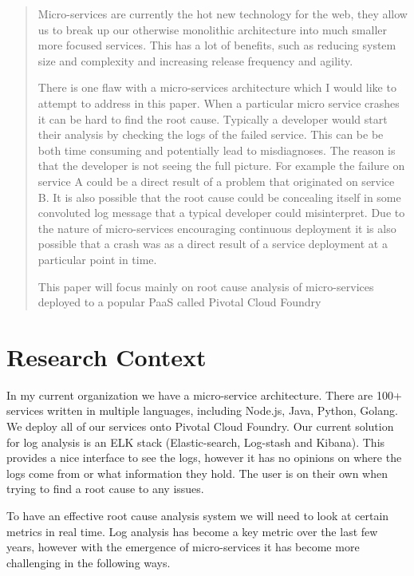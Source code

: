 \begin{abstract}
Micro-services are currently the hot new technology for the web, they allow us to break up our otherwise monolithic architecture into much smaller more focused services. This has a lot of benefits, such as reducing system size and complexity and increasing release frequency and agility. 

There is one flaw with a micro-services architecture which I would like to attempt to address in this paper. When a particular micro service crashes it can be hard to find the root cause. Typically a developer would start their analysis by checking the logs of the failed service. This can be be both time consuming and potentially lead to misdiagnoses. The reason is that the developer is not seeing the full picture. For example the failure on service A could be a direct result of a problem that originated on service B. It is also possible that the root cause could be concealing itself in some convoluted log message that a typical developer could misinterpret. Due to the nature of micro-services encouraging continuous deployment it is also possible that a crash was as a direct result of a service deployment at a particular point in time. 

This paper will focus mainly on root cause analysis of micro-services deployed to a popular PaaS called Pivotal Cloud Foundry

\end{abstract}

\chapter{Research Context}
In my current organization we have a micro-service architecture. There are 100+ services written in multiple languages, including Node.js, Java, Python, Golang. We deploy all of our services onto Pivotal Cloud Foundry. Our current solution for log analysis is an ELK stack (Elastic-search, Log-stash and Kibana). This provides a nice interface to see the logs, however it has no opinions on where the logs come from or what information they hold. The user is on their own when trying to find a root cause to any issues.

To have an effective root cause analysis system we will need to look at certain metrics in real time. Log analysis has become a key metric over the last few years, however with the emergence of micro-services it has become more challenging in the following ways.

